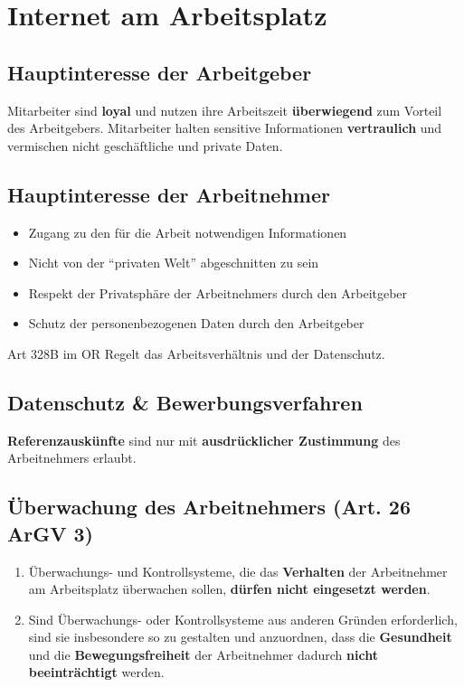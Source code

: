 \section{Internet am Arbeitsplatz}

\subsection{Hauptinteresse der Arbeitgeber}

Mitarbeiter sind \textbf{loyal} und nutzen ihre Arbeitszeit
\textbf{überwiegend} zum Vorteil des Arbeitgebers. Mitarbeiter halten
sensitive Informationen \textbf{vertraulich} und vermischen nicht
geschäftliche und private Daten.

\subsection{Hauptinteresse der Arbeitnehmer}

\begin{itemize}
\tightlist
\item Zugang zu den für die Arbeit notwendigen Informationen
\item Nicht von der ``privaten Welt'' abgeschnitten zu sein
\item Respekt der Privatsphäre der Arbeitnehmers durch den Arbeitgeber
\item Schutz der personenbezogenen Daten durch den Arbeitgeber
\end{itemize}

Art 328B im OR Regelt das Arbeitsverhältnis und der Datenschutz.

\subsection{Datenschutz \& Bewerbungsverfahren}

\textbf{Referenzauskünfte} sind nur mit \textbf{ausdrücklicher Zustimmung} des
Arbeitnehmers erlaubt.

\subsection{Überwachung des Arbeitnehmers (Art. 26 ArGV 3)}
\label{sec:IW-Überwachung}

\begin{enumerate}
	\tightlist
	\item Überwachungs- und Kontrollsysteme, die das \textbf{Verhalten} der
	Arbeitnehmer am Arbeitsplatz überwachen sollen, \textbf{dürfen nicht
	eingesetzt werden}.
	\item Sind Überwachungs- oder Kontrollsysteme aus anderen Gründen
	erforderlich, sind sie insbesondere so zu gestalten und anzuordnen,
	dass die \textbf{Gesundheit} und die \textbf{Bewegungsfreiheit} der
	Arbeitnehmer dadurch \textbf{nicht beeinträchtigt} werden.
\end{enumerate}

